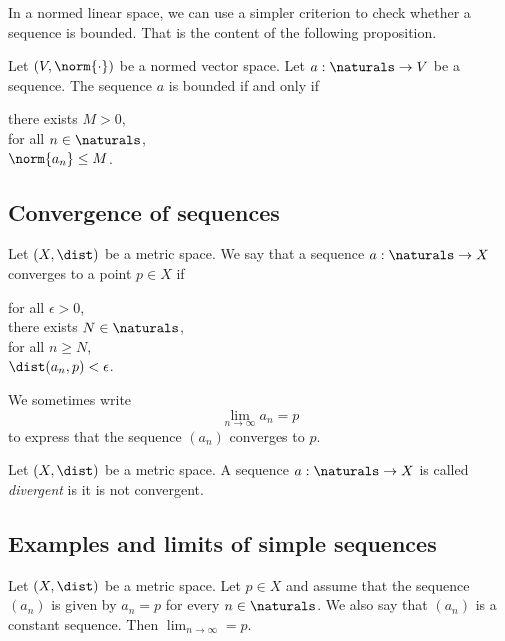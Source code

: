 In a normed linear space, we can use a simpler criterion to check whether a sequence is bounded. That is the content of the
following proposition.

\begin{proposition}
    Let $(V, \norm{\cdot})$ be a normed vector space. Let $a: \naturals \to V$ be a sequence. The sequence $a$ is bounded
    if and only if
    \begin{center}
        \parbox{\linewidth}{
            \linewidth
            there exists $M > 0$, \\
            \tab for all $n \in \naturals$, \\
            \tab\tab $\norm{a_n} \le M$.
        }
    \end{center}
\end{proposition}

\subsection{Convergence of sequences}
\begin{definition}
    Let $(X, \dist)$ be a metric space. We say that a sequence $a: \naturals \to X$ converges to a point $p \in X$ if
    \begin{center}
        \parbox{\linewidth}{
            \linewidth
            for all $\epsilon > 0$, \\
            \tab there exists $N \in \naturals$, \\
            \tab\tab for all $n \ge N$, \\
            \tab\tab\tab $\dist(a_n,p) < \epsilon$.
        }
    \end{center}
\end{definition}

We sometimes write
$$\lim_{n\to\infty}a_n = p$$
to express that the sequence $(a_n)$ converges to $p$.

\begin{definition}
    Let $(X, \dist)$ be a metric space. A sequence $a: \naturals \to X$ is called \emph{divergent} is it is not convergent.
\end{definition}

\subsection{Examples and limits of simple sequences}
\begin{proposition}
    Let $(X, \dist)$ be a metric space. Let $p \in X$ and assume that the sequence $(a_n)$ is given by $a_n = p$ for every
    $n \in \naturals$. We also say that $(a_n)$ is a constant sequence. Then $\lim_{n\to\infty} = p$.
\end{proposition}

